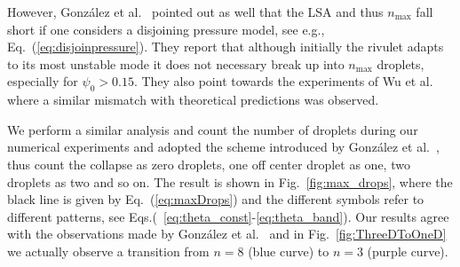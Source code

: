 \documentclass[twoside,twocolumn,9pt]{article}
\begin{document}
However, Gonz{\'a}lez et al.~\cite{gonzalezStabilityLiquidRing2013} pointed out as well that the LSA and thus $n_{\max}$ fall short if one considers a disjoining pressure model, see e.g., Eq.~(\ref{eq:disjoinpressure}).
They report that although initially the rivulet adapts to its most unstable mode it does not necessary break up into $n_{\max}$ droplets, especially for $\psi_0 > 0.15$. 
They also point towards the experiments of Wu et al.~\cite{wuCompetingLiquidPhase2011} where a similar mismatch with theoretical predictions was observed.

We perform a similar analysis and count the number of droplets during our numerical experiments and adopted the scheme introduced by Gonz{\'a}lez et al.~\cite{gonzalezStabilityLiquidRing2013}, thus count the collapse as zero droplets, one off center droplet as one, two droplets as two and so on.
The result is shown in Fig.~\ref{fig:max_drops}, where the black line is given by Eq.~(\ref{eq:maxDrops}) and the different symbols refer to different patterns, see Eqs.(~\ref{eq:theta_const}-\ref{eq:theta_band}).
Our results agree with the observations made by Gonz{\'a}lez et al.~\cite{gonzalezStabilityLiquidRing2013} and in Fig.~\ref{fig:ThreeDToOneD} we actually observe a transition from $n = 8$ (blue curve) to $n = 3$ (purple curve).
\end{document}
